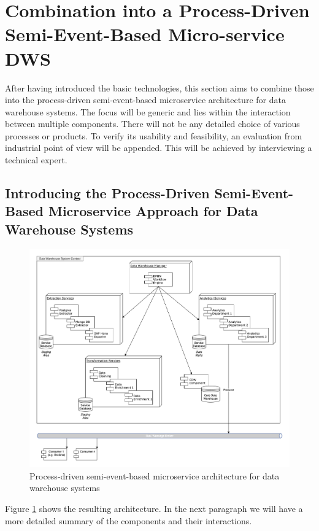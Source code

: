 \section{Combination into a Process-Driven Semi-Event-Based Micro-service DWS}
\label{sec:finalArchitecture}
After having introduced the basic technologies, this section aims to combine those into the process-driven semi-event-based microservice architecture for data warehouse systems. The focus will be generic and lies within the interaction between multiple components. There will not be any detailed choice of various processes or products. To verify its usability and feasibility, an evaluation from industrial point of view will be appended. This will be achieved by interviewing a technical expert.

\subsection{Introducing the Process-Driven Semi-Event-Based Microservice Approach for Data Warehouse Systems}
\begin{figure}[!htb]
    \centering
    \includegraphics[scale=0.43]{pictures/ResultingArchitecture.png}
    \caption{Process-driven semi-event-based microservice architecture for data warehouse systems}
    \label{fig:resultingArch}
\end{figure}
Figure \ref{fig:resultingArch} shows the resulting architecture. In the next paragraph we will have a more detailed summary of the components and their interactions.\newline
